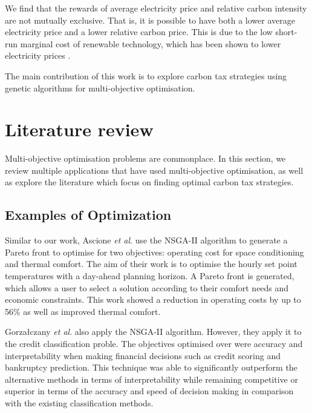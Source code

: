 We find that the rewards of average electricity price and relative carbon intensity are not mutually exclusive. That is, it is possible to have both a lower average electricity price and a lower relative carbon price. This is due to the low short-run marginal cost of renewable technology, which has been shown to lower electricity prices \cite{OMahoney2011}.

The main contribution of this work is to explore carbon tax strategies using genetic algorithms for multi-objective optimisation. 











\section{Literature review}
\label{carbonoptim:sec:litreview}

Multi-objective optimisation problems are commonplace. In this section, we review multiple applications that have used multi-objective optimisation, as well as explore the literature which focus on finding optimal carbon tax strategies.

\subsection{Examples of Optimization}

Similar to our work, Ascione  \textit{et al}. \cite{Ascione2016} use the NSGA-II algorithm to generate a Pareto front to optimise for two objectives: operating cost for space conditioning and thermal comfort. The aim of their work is to optimise the hourly set point temperatures with a day-ahead planning horizon. A Pareto front is generated, which allows a user to select a solution according to their comfort needs and economic constraints. This work showed a reduction in operating costs by up to 56\% as well as improved thermal comfort.

Gorza\l{}czany \textit{et al}. \cite{Gorzaczany2016a} also apply the NSGA-II algorithm. However, they apply it to the credit classification proble. The objectives optimised over were accuracy and interpretability when making financial decisions such as credit scoring and bankruptcy prediction. This technique was able to significantly outperform the alternative methods in terms of interpretability while remaining competitive or superior in terms of the accuracy and speed of decision making in comparison with the existing classification methods.

